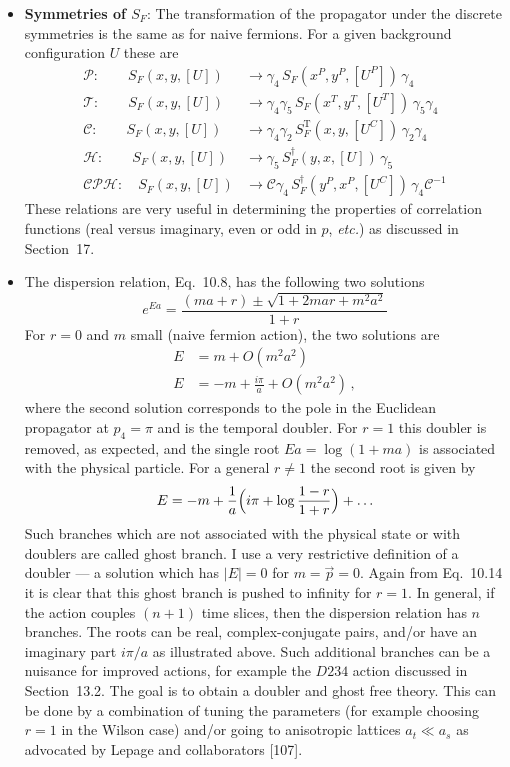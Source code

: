 \begin{itemize}
\item \textbf{Symmetries of $S_F$}: The transformation of the propagator under
the discrete symmetries is the same as for naive fermions.  For a given
background configuration $U$ these are
\begin{align}
\mathcal{P}: \qquad S_F(x,y,[U]) &\to \gamma_4\,S_F(x^P,y^P,[U^P])\,\gamma_4 \nonumber\\
\mathcal{T}: \qquad S_F(x,y,[U]) &\to \gamma_4\gamma_5\,S_F(x^T,y^T,[U^T])\,\gamma_5\gamma_4 \nonumber\\
\mathcal{C}: \qquad S_F(x,y,[U]) &\to \gamma_4\gamma_2\,S_F^{\mathrm{T}}(x,y,[U^C])\,\gamma_2\gamma_4 \nonumber\\
\mathcal{H}: \qquad S_F(x,y,[U]) &\to \gamma_5\,S_F^\dagger(y,x,[U])\,\gamma_5 \nonumber\\
\mathcal{CPH}: \quad S_F(x,y,[U]) &\to \mathcal{C}\gamma_4\,S_F^\dagger(y^P,x^P,[U^C])\,\gamma_4\mathcal{C}^{-1}
\end{align}
These relations are very useful in determining the properties of correlation
functions (real versus imaginary, even or odd in $p$, \textit{etc.}) as
discussed in Section~17.

\item The dispersion relation, Eq.~10.8, has the following two solutions
\begin{equation}
e^{Ea} = \frac{(ma + r) \pm \sqrt{1 + 2mar + m^2 a^2}}{1+r}
\end{equation}
For $r = 0$ and $m$ small (naive fermion action), the two solutions are
\begin{align}
E &= m + O(m^2 a^2) \nonumber\\
E &= -m + \frac{i\pi}{a} + O(m^2 a^2) \,,
\end{align}
where the second solution corresponds to the pole in the Euclidean propagator
at $p_4 = \pi$ and is the temporal doubler.  For $r = 1$ this doubler is
removed, as expected, and the single root $Ea = \log(1 + ma)$ is associated
with the physical particle.  For a general $r \neq 1$ the second root is given
by
\begin{equation}
E = -m + \frac{1}{a} \Bigl( i\pi + \log \frac{1-r}{1+r} \Bigr) + \ldots
\end{equation}
Such branches which are not associated with the physical state or with doublers
are called ghost branch.  I use a very restrictive definition of a doubler ---
a solution which has $|E| = 0$ for $m = \vec{p} = 0$.  Again from Eq.~10.14 it
is clear that this ghost branch is pushed to infinity for $r = 1$.  In general,
if the action couples $(n+1)$ time slices, then the dispersion relation has
$n$ branches.  The roots can be real, complex-conjugate pairs, and/or have an
imaginary part $i\pi/a$ as illustrated above.  Such additional branches can be
a nuisance for improved actions, for example the $D234$ action discussed in
Section~13.2.  The goal is to obtain a doubler and ghost free theory.  This can
be done by a combination of tuning the parameters (for example choosing $r = 1$
in the Wilson case) and/or going to anisotropic lattices $a_t \ll a_s$ as
advocated by Lepage and collaborators [107].


\end{itemize}
